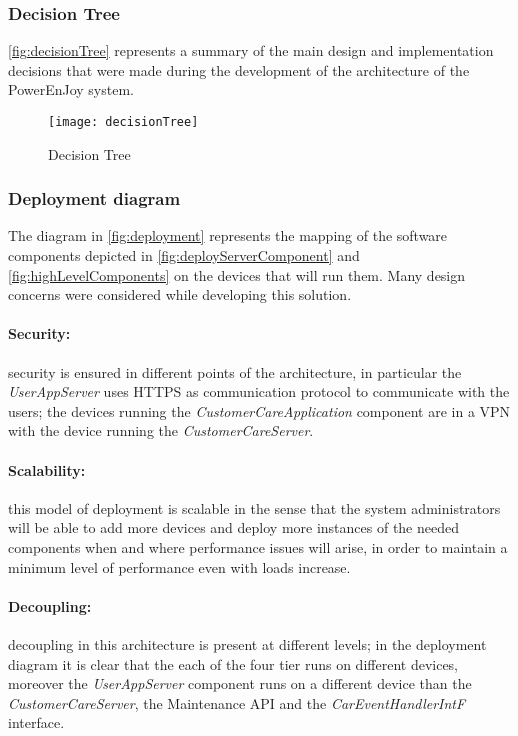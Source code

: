 \subsubsection{Decision Tree}
\autoref{fig:decisionTree} represents a summary of the main design and implementation decisions that were made during the development of the architecture of the PowerEnJoy system.\\

\begin{figure}[h!]
	\centering
	\texttt{[image: decisionTree]}
	\caption{
		\label{fig:decisionTree}  
		Decision Tree
	}
\end{figure}
\clearpage
\subsubsection{Deployment diagram}
The diagram in \autoref{fig:deployment} represents the mapping of the software components depicted in \autoref{fig:deployServerComponent} and \autoref{fig:highLevelComponents} on the devices that will run them. Many design concerns were considered while developing this solution.
\paragraph{Security:}security is ensured in different points of the architecture, in particular the \emph{UserAppServer} uses HTTPS as communication protocol to communicate with the users; the devices running the \emph{CustomerCareApplication} component are in a VPN with the device running the \emph{CustomerCareServer}.
\paragraph{Scalability:}this model of deployment is scalable in the sense that the system administrators will be able to add more devices and deploy more instances of the needed components when and where performance issues will arise, in order to maintain a minimum level of performance even with loads increase.
\paragraph{Decoupling:}decoupling in this architecture is present at different levels; in the deployment diagram it is clear that the each of the four tier runs on different devices, moreover the \emph{UserAppServer} component runs on a different device than the \emph{CustomerCareServer}, the Maintenance API and the \textit{CarEventHandlerIntF} interface.
